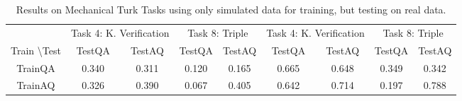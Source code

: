 \begin{table}[h]
\begin{tabular}{ccccccccc}
&\multicolumn{2}{c}{Task 4: K. Verification}&\multicolumn{2}{c}{Task 8: Triple}
&\multicolumn{2}{c}{Task 4: K. Verification}&\multicolumn{2}{c}{Task 8: Triple}  \\\cmidrule{2-3}\cmidrule{4-5}\cmidrule{6-7}\cmidrule{8-9}
Train \textbackslash Test &TestQA&TestAQ &TestQA&TestAQ &TestQA&TestAQ &TestQA&TestAQ\\
TrainQA & 0.340 & 0.311  & 0.120 & 0.165 & 0.665  & 0.648  & 0.349 & 0.342\\
TrainAQ & 0.326 & 0.390  & 0.067 & 0.405 & 0.642  & 0.714  & 0.197 & 0.788 \\\bottomrule
\end{tabular}
\caption{Results on Mechanical Turk Tasks using only simulated data for training,
but testing on real data.
\label{res:mturk_main3}}
\end{table}






